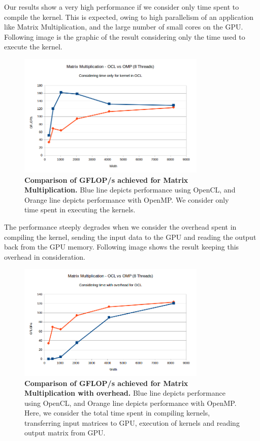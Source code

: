 \documentclass[]{scrartcl}
\begin{document}
Our results show a very  high performance if we consider only time spent to compile the kernel. This is expected, owing to high
parallelism of an application like Matrix Multiplication, and the large number of small cores on the GPU. Following image is the
graphic of the result considering only the time used to execute the kernel.

\begin{figure}[hb]
	\centering
	\includegraphics[width=0.8\textwidth]{mat_mul_ocl_vs_omp_kernel}
	\caption{\textbf{Comparison of GFLOP/s achieved for Matrix Multiplication.} Blue line depicts performance using OpenCL,
		and Orange line depicts performance with OpenMP. We consider only time spent in executing the kernels.}
\end{figure}

The performance steeply degrades when we consider the overhead spent in compiling the kernel, sending the input data to the GPU
and reading the output back from the GPU memory. Following image shows the result keeping this overhead in consideration.

\begin{figure}[hb]
	\centering
	\includegraphics[width=0.8\textwidth]{mat_mul_ocl_vs_omp_overhead}
	\caption{\textbf{Comparison of GFLOP/s achieved for Matrix Multiplication with overhead.} Blue line depicts performance using
		OpenCL, and Orange line depicts performance with OpenMP. Here, we consider the total time spent in compiling kernels,
		transferring input matrices to GPU, execution of kernels and reading output matrix from GPU.}
\end{figure}
\end{document}
